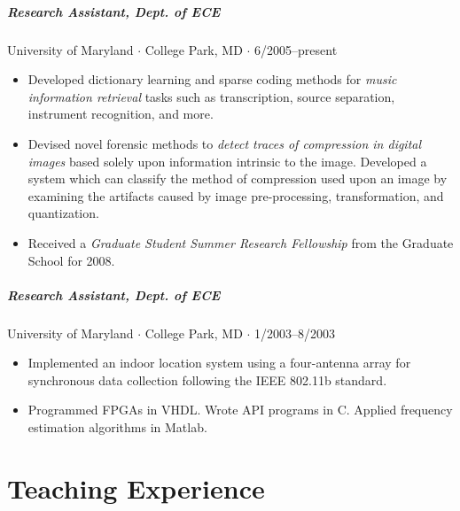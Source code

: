 \documentclass[10pt,letterpaper]{article}
\begin{document}
\subparagraph{Research Assistant, Dept. of ECE}
University of Maryland $\cdot$ College Park, MD $\cdot$ 6/2005--present 
\begin{itemize}
\item Developed dictionary learning and sparse coding methods for \textit{music information retrieval} tasks such as transcription, source separation, instrument recognition, and more.
\item Devised novel forensic methods to \textit{detect traces of compression in digital images} based solely upon information intrinsic to the image. Developed a system which can classify the method of compression used upon an image by examining the artifacts caused by image pre-processing, transformation, and quantization.
\item Received a \textit{Graduate Student Summer Research Fellowship} from the Graduate School for 2008.
\end{itemize}

\subparagraph{Research Assistant, Dept. of ECE}
University of Maryland $\cdot$ College Park, MD $\cdot$ 1/2003--8/2003
\begin{itemize}
	\item Implemented an indoor location system using a four-antenna array for synchronous data collection following the IEEE 802.11b standard.
	\item Programmed FPGAs in VHDL. Wrote API programs in C.  Applied frequency estimation algorithms in Matlab.
\end{itemize}






\section*{Teaching Experience}
\end{document}
